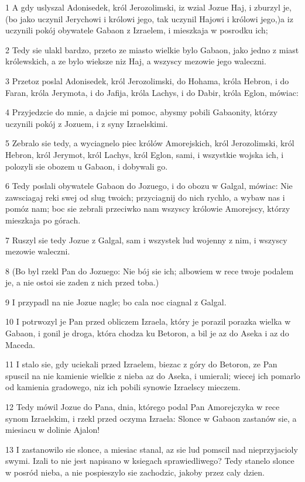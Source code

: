 \par 1 A gdy uslyszal Adonisedek, król Jerozolimski, iz wzial Jozue Haj, i zburzyl je, (bo jako uczynil Jerychowi i królowi jego, tak uczynil Hajowi i królowi jego,)a iz uczynili pokój obywatele Gabaon z Izraelem, i mieszkaja w posrodku ich;
\par 2 Tedy sie ulakl bardzo, przeto ze miasto wielkie bylo Gabaon, jako jedno z miast królewskich, a ze bylo wieksze niz Haj, a wszyscy mezowie jego waleczni.
\par 3 Przetoz poslal Adonisedek, król Jerozolimski, do Hohama, króla Hebron, i do Faran, króla Jerymota, i do Jafija, króla Lachys, i do Dabir, króla Eglon, mówiac:
\par 4 Przyjedzcie do mnie, a dajcie mi pomoc, abysmy pobili Gabaonity, którzy uczynili pokój z Jozuem, i z syny Izraelskimi.
\par 5 Zebralo sie tedy, a wyciagnelo piec królów Amorejskich, król Jerozolimski, król Hebron, król Jerymot, król Lachys, król Eglon, sami, i wszystkie wojska ich, i polozyli sie obozem u Gabaon, i dobywali go.
\par 6 Tedy poslali obywatele Gabaon do Jozuego, i do obozu w Galgal, mówiac: Nie zawsciagaj reki swej od slug twoich; przyciagnij do nich rychlo, a wybaw nas i pomóz nam; boc sie zebrali przeciwko nam wszyscy królowie Amorejscy, którzy mieszkaja po górach.
\par 7 Ruszyl sie tedy Jozue z Galgal, sam i wszystek lud wojenny z nim, i wszyscy mezowie waleczni.
\par 8 (Bo byl rzekl Pan do Jozuego: Nie bój sie ich; albowiem w rece twoje podalem je, a nie ostoi sie zaden z nich przed toba.)
\par 9 I przypadl na nie Jozue nagle; bo cala noc ciagnal z Galgal.
\par 10 I potrwozyl je Pan przed obliczem Izraela, który je porazil porazka wielka w Gabaon, i gonil je droga, która chodza ku Betoron, a bil je az do Aseka i az do Maceda.
\par 11 I stalo sie, gdy uciekali przed Izraelem, biezac z góry do Betoron, ze Pan spuscil na nie kamienie wielkie z nieba az do Aseka, i umierali; wiecej ich pomarlo od kamienia gradowego, niz ich pobili synowie Izraelscy mieczem.
\par 12 Tedy mówil Jozue do Pana, dnia, którego podal Pan Amorejczyka w rece synom Izraelskim, i rzekl przed oczyma Izraela: Slonce w Gabaon zastanów sie, a miesiacu w dolinie Ajalon!
\par 13 I zastanowilo sie slonce, a miesiac stanal, az sie lud pomscil nad nieprzyjacioly swymi. Izali to nie jest napisano w ksiegach sprawiedliwego? Tedy stanelo slonce w posród nieba, a nie pospieszylo sie zachodzic, jakoby przez caly dzien.
